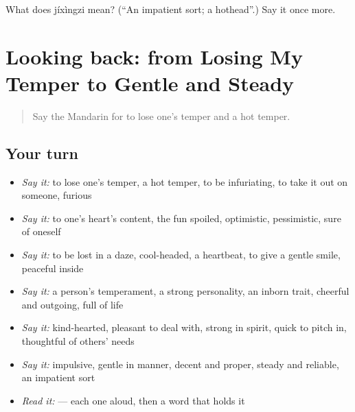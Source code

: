 \begin{tcolorbox}[breakable,colback=teal!4,colframe=teal!35!black,title={Before you move on}]
What does jíxìngzi mean? (\textquotedblleft{}An impatient sort; a hothead\textquotedblright{}.) Say it once more.
\end{tcolorbox}
\section[(dialogue)]{Looking back: from Losing My Temper to Gentle and Steady}

\label{lesson:ZH-R469-review-464-469}



\begin{quote}
Say the Mandarin for to lose one's temper and a hot temper.
\end{quote}

\subsection*{Your turn}
\begin{itemize}
\raggedright
  \item \emph{Say it:} to lose one's temper, a hot temper, to be infuriating, to take it out on someone, furious
  \item \emph{Say it:} to one's heart's content, the fun spoiled, optimistic, pessimistic, sure of oneself
  \item \emph{Say it:} to be lost in a daze, cool-headed, a heartbeat, to give a gentle smile, peaceful inside
  \item \emph{Say it:} a person's temperament, a strong personality, an inborn trait, cheerful and outgoing, full of life
  \item \emph{Say it:} kind-hearted, pleasant to deal with, strong in spirit, quick to pitch in, thoughtful of others' needs
  \item \emph{Say it:} impulsive, gentle in manner, decent and proper, steady and reliable, an impatient sort
  \item \emph{Read it:}     — each one aloud, then a word that holds it
\end{itemize}

